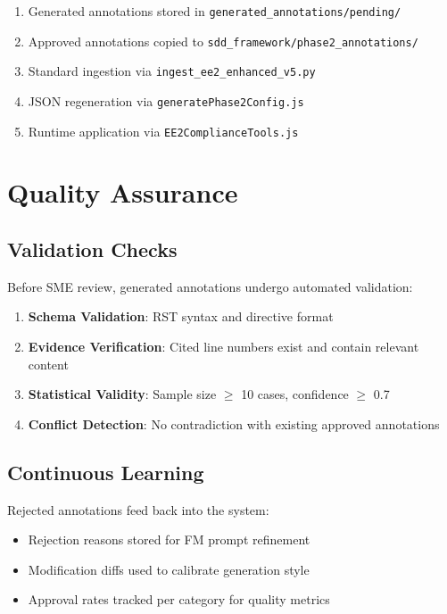 \documentclass[11pt,a4paper]{article}
\begin{document}
\begin{enumerate}
    \item Generated annotations stored in \texttt{generated\_annotations/pending/}
    \item Approved annotations copied to \texttt{sdd\_framework/phase2\_annotations/}
    \item Standard ingestion via \texttt{ingest\_ee2\_enhanced\_v5.py}
    \item JSON regeneration via \texttt{generatePhase2Config.js}
    \item Runtime application via \texttt{EE2ComplianceTools.js}
\end{enumerate}

\section{Quality Assurance}

\subsection{Validation Checks}

Before SME review, generated annotations undergo automated validation:

\begin{enumerate}
    \item \textbf{Schema Validation}: RST syntax and directive format
    \item \textbf{Evidence Verification}: Cited line numbers exist and contain relevant content
    \item \textbf{Statistical Validity}: Sample size $\geq$ 10 cases, confidence $\geq$ 0.7
    \item \textbf{Conflict Detection}: No contradiction with existing approved annotations
\end{enumerate}

\subsection{Continuous Learning}

Rejected annotations feed back into the system:

\begin{itemize}
    \item Rejection reasons stored for FM prompt refinement
    \item Modification diffs used to calibrate generation style
    \item Approval rates tracked per category for quality metrics
\end{itemize}
\end{document}
